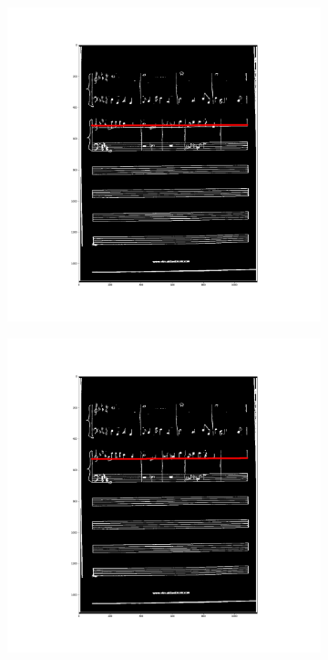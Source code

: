 \documentclass[12pt]{article}
\begin{document}
\begin{figure}[h!]
\begin{subfigure}[b]{0.32\linewidth}
		\end{subfigure}
		\begin{subfigure}[b]{0.32\linewidth}
			\includegraphics[width=\linewidth]{zdj/BFS14.png}
		\end{subfigure}
		\begin{subfigure}[b]{0.32\linewidth}
			\includegraphics[width=\linewidth]{zdj/BFS15.png}

\end{subfigure}
\end{figure}
\end{document}
